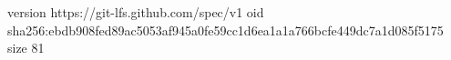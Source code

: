 version https://git-lfs.github.com/spec/v1
oid sha256:ebdb908fed89ac5053af945a0fe59cc1d6ea1a1a766bcfe449dc7a1d085f5175
size 81
